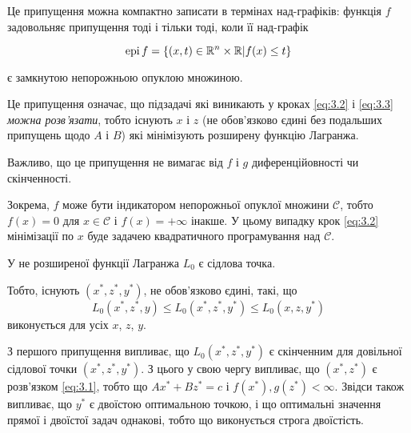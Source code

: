 Це припущення можна компактно записати в термінах над-графіків: функція $f$ задовольняє припущення тоді і тільки тоді, коли її над-графік

\begin{equation}
	\operatorname{epi} f = \left\{ (x, t) \in \mathbb{R}^n \times \mathbb{R} \middle| f(x) \le t \right\}
\end{equation}

є замкнутою непорожньою опуклою множиною. 

\begin{remark}
    Це припущення означає, що підзадачі які виникають у кроках \eqref{eq:3.2} і \eqref{eq:3.3} \textit{можна розв'язати}, тобто існують $x$ і $z$ (не обов'язково єдині без подальших припущень щодо $A$ і $B$) які мінімізують розширену функцію Лагранжа.
\end{remark}

\begin{remark}
    Важливо, що це припущення не вимагає від $f$ і $g$ диференційовності чи скінченності.
\end{remark}

\begin{example}
    Зокрема, $f$ може бути індикатором непорожньої опуклої множини $\mathcal{C}$, тобто $f(x) = 0$ для $x \in \mathcal{C}$ і $f(x) = + \infty$ інакше. У цьому випадку крок \eqref{eq:3.2} мінімізації по $x$ буде задачею квадратичного програмування над $\mathcal{C}$.
\end{example}

\begin{assumption}
	У не розширеної функції Лагранжа $L_0$ є сідлова точка.
\end{assumption}

Тобто, існують $\left( x^*, z^*, y^* \right)$, не обов'язково єдині, такі, що
\begin{equation}
	L_0 \left( x^*, z^*, y \right) \le L_0 \left( x^*, z^*, y^* \right) \le L_0 \left( x, z, y^* \right)
\end{equation}
виконується для усіх $x$, $z$, $y$. \medskip

З першого припущення випливає, що $L_0 \left( x^*, z^*, y^* \right)$ є скінченним для довільної сідлової точки $\left( x^*, z^*, y^* \right)$. З цього у свою чергу випливає, що $ \left( x^*, z^* \right)$ є розв'язком \eqref{eq:3.1}, тобто що $A x^* + B z^* = c$ і $f \left( x^* \right), g \left( z^* \right) < \infty$. Звідси також випливає, що $y^*$ є двоїстою оптимальною точкою, і що оптимальні значення прямої і двоїстої задач однакові, тобто що виконується строга двоїстість. 


